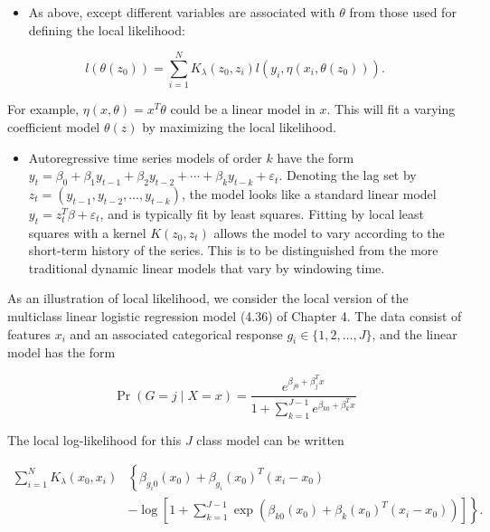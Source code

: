 \documentclass[10pt]{article}
\begin{document}
\begin{itemize}
  \item As above, except different variables are associated with $\theta$ from those used for defining the local likelihood:
\end{itemize}

$$
l\left(\theta\left(z_{0}\right)\right)=\sum_{i=1}^{N} K_{\lambda}\left(z_{0}, z_{i}\right) l\left(y_{i}, \eta\left(x_{i}, \theta\left(z_{0}\right)\right)\right) .
$$

For example, $\eta(x, \theta)=x^{T} \theta$ could be a linear model in $x$. This will fit a varying coefficient model $\theta(z)$ by maximizing the local likelihood.

\begin{itemize}
  \item Autoregressive time series models of order $k$ have the form $y_{t}= \beta_{0}+\beta_{1} y_{t-1}+\beta_{2} y_{t-2}+\cdots+\beta_{k} y_{t-k}+\varepsilon_{t}$. Denoting the lag set by $z_{t}=\left(y_{t-1}, y_{t-2}, \ldots, y_{t-k}\right)$, the model looks like a standard linear model $y_{t}=z_{t}^{T} \beta+\varepsilon_{t}$, and is typically fit by least squares. Fitting by local least squares with a kernel $K\left(z_{0}, z_{t}\right)$ allows the model to vary according to the short-term history of the series. This is to be distinguished from the more traditional dynamic linear models that vary by windowing time.
\end{itemize}

As an illustration of local likelihood, we consider the local version of the multiclass linear logistic regression model (4.36) of Chapter 4. The data consist of features $x_{i}$ and an associated categorical response $g_{i} \in\{1,2, \ldots, J\}$, and the linear model has the form


\begin{equation*}
\operatorname{Pr}(G=j \mid X=x)=\frac{e^{\beta_{j 0}+\beta_{j}^{T} x}}{1+\sum_{k=1}^{J-1} e^{\beta_{k 0}+\beta_{k}^{T} x}} \tag{6.18}
\end{equation*}


The local log-likelihood for this $J$ class model can be written


\begin{align*}
\sum_{i=1}^{N} K_{\lambda}\left(x_{0}, x_{i}\right) & \left\{\beta_{g_{i} 0}\left(x_{0}\right)+\beta_{g_{i}}\left(x_{0}\right)^{T}\left(x_{i}-x_{0}\right)\right. \\
& \left.-\log \left[1+\sum_{k=1}^{J-1} \exp \left(\beta_{k 0}\left(x_{0}\right)+\beta_{k}\left(x_{0}\right)^{T}\left(x_{i}-x_{0}\right)\right)\right]\right\} . \tag{6.19}
\end{align*}
\end{document}
